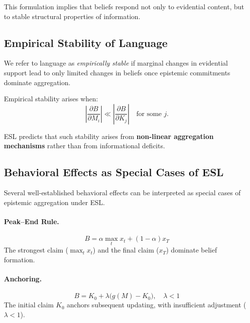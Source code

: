 \documentclass[11pt,a4paper]{article}
\begin{document}
This formulation implies that beliefs respond not only to evidential content, but to stable structural properties of information.


\subsection{Empirical Stability of Language}

We refer to language as \emph{empirically stable} if marginal changes in evidential support lead to only limited changes in beliefs once epistemic commitments dominate aggregation.

\begin{principlebox}
Empirical stability arises when:
\begin{equation}
\left|\frac{\partial B}{\partial M_i}\right| \ll \left|\frac{\partial B}{\partial K_j}\right|
\quad \text{for some } j.
\end{equation}

ESL predicts that such stability arises from \textbf{non-linear aggregation mechanisms} rather than from informational deficits.
\end{principlebox}


\subsection{Behavioral Effects as Special Cases of ESL}

Several well-established behavioral effects can be interpreted as special cases of epistemic aggregation under ESL.

\paragraph{Peak--End Rule.}
\begin{equation}
B = \alpha \max_t x_t + (1-\alpha) x_T
\end{equation}
The strongest claim ($\max_t x_t$) and the final claim ($x_T$) dominate belief formation.

\paragraph{Anchoring.}
\begin{equation}
B = K_0 + \lambda \big(g(M) - K_0\big), \quad \lambda < 1
\end{equation}
The initial claim $K_0$ anchors subsequent updating, with insufficient adjustment ($\lambda < 1$).
\end{document}
